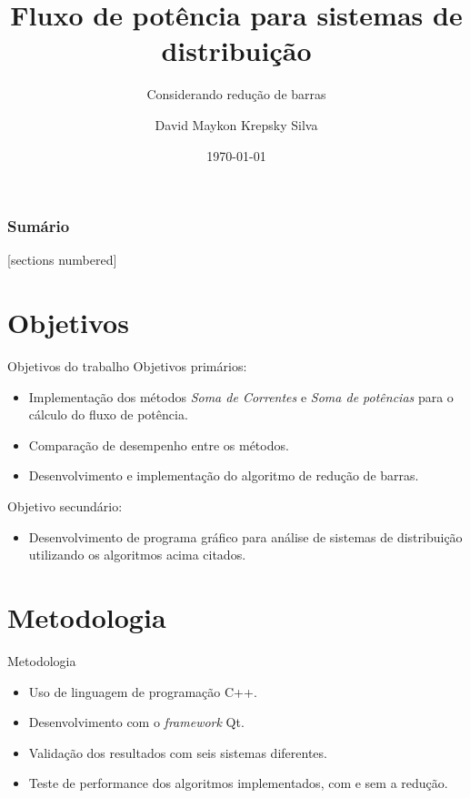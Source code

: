 \documentclass[10pt]{beamer}
\title{Fluxo de potência para sistemas de distribuição}
\subtitle{Considerando redução de barras}
\date{\today}
\author{David Maykon Krepsky Silva}
\institute{Departamento de Engenharia Elétrica}
\begin{document}
\maketitle

\begin{frame}
  \frametitle{Sumário}
  [sections numbered]
  \tableofcontents[hideallsubsections]
\end{frame}

\section{Objetivos}
\begin{frame}{Objetivos do trabalho}
    Objetivos primários:
    \begin{itemize}
        \item Implementação dos métodos \textit{Soma de Correntes} e \textit{Soma de potências} para o cálculo do fluxo de potência.
        
        \item Comparação de desempenho entre os métodos.
        
        \item Desenvolvimento e implementação do algoritmo de redução de barras.
    \end{itemize}
    
    Objetivo secundário:
    \begin{itemize}
        \item Desenvolvimento de programa gráfico para análise de sistemas de distribuição utilizando os algoritmos acima citados.
    \end{itemize}
\end{frame}

\section{Metodologia}

\begin{frame}{Metodologia}
    
    \begin{itemize}
        \item Uso de linguagem de programação C++.
        
        \item Desenvolvimento com o \textit{framework} Qt.
        
        \item Validação dos resultados com seis sistemas diferentes.
        
        \item Teste de performance dos algoritmos implementados, com e sem a redução.
    \end{itemize}
\end{frame}
\end{document}
